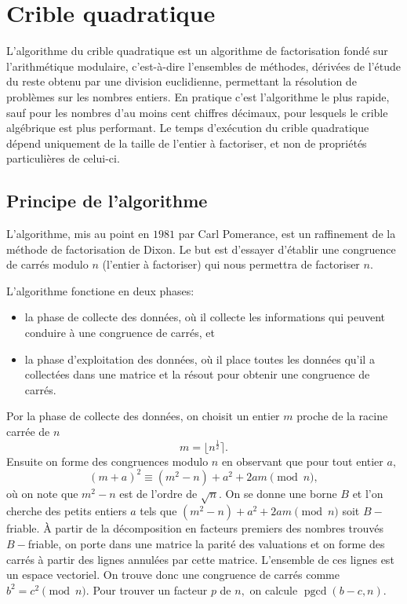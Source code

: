 \documentclass[french, 12pt, titlepage]{article}
\newenvironment{itemH}[0]{\begin{itemize}[label=$\bullet$, font=\color{black} \large]}{\end{itemize}}
\DeclareMathOperator{\pgcd}{pgcd}
\begin{document}
\section{Crible quadratique}

L'algorithme du crible quadratique est un algorithme de factorisation fondé sur l'arithmétique modulaire, c'est-à-dire l'ensembles de méthodes, dérivées de l'étude du reste obtenu par une division euclidienne, permettant la résolution de problèmes sur les nombres entiers. En pratique c'est l'algorithme le plus rapide, sauf pour les nombres d'au moins cent chiffres décimaux, pour lesquels le crible algébrique est plus performant.
Le temps d'exécution du crible quadratique dépend uniquement de la taille de l'entier à factoriser, et non de propriétés particulières de celui-ci.

\subsection{Principe de l'algorithme}

L'algorithme, mis au point en $1981$ par Carl Pomerance, est un raffinement de la méthode de factorisation de Dixon. Le but est d'essayer d'établir une congruence de carrés modulo $n$ (l'entier à factoriser) qui nous permettra de factoriser $n.$

L'algorithme fonctione en deux phases:
\begin{itemH}
\item la phase de collecte des données, où il collecte les informations qui peuvent conduire à une congruence de carrés, et
\item la phase d'exploitation des données, où il place toutes les données qu'il a collectées dans une matrice et la résout pour obtenir une congruence de carrés.
\end{itemH}

Por la phase de collecte des données, on choisit un entier $m$ proche de la racine carrée de $n$ \[ m = \lfloor n^{\frac{1}{2}} \rceil .\]
Ensuite on forme des congruences modulo $n$ en observant que pour tout entier $a,$ \[ (m + a)^2 \equiv (m^2 - n) + a^2 + 2am \pmod n , \] où on note que $m^2 - n$ est de l'ordre de $\sqrt{n}.$
On se donne une borne $B$ et l'on cherche des petits entiers $a$ tels que $(m^2 - n) + a^2 + 2am \pmod n$ soit $B-$friable.
{\`A} partir de la décomposition en facteurs premiers des nombres trouvés $B-$friable, on porte dans une matrice la parité des valuations et on forme des carrés à partir des lignes annulées par cette matrice. L'ensemble de ces lignes est un espace vectoriel. On trouve donc une congruence de carrés comme $b^2 = c^2 \pmod n.$ Pour trouver un facteur $p$ de $n,$ on calcule $\pgcd(b - c, n).$
\end{document}
